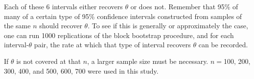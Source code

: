 \documentclass[12pt, letterpaper, titlepage]{article}
\begin{document}
Each of these 6 intervals either recovers $\theta$ or does not. Remember that 95\% of many of a certain type of 95\% confidence intervals constructed from samples of the same $n$ should recover $\theta$. To see if this is generally or approximately the case, one can run 1000 replications of the block bootstrap procedure, and for each interval-$\theta$ pair, the rate at which that type of interval recovers $\theta$ can be recorded.


If $\theta$ is not covered at that $n$, a larger sample size must be necessary. $n = $100, 200, 300, 400, and 500, 600, 700 were used in this study. 

\end{document}
